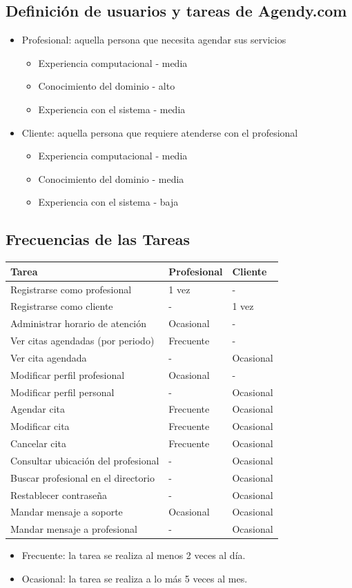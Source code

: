 \documentclass[letter, 10pt]{article}
\begin{document}
\subsection{Definición de usuarios y tareas de Agendy.com}
\begin{itemize}
	\item Profesional: aquella persona que necesita agendar sus servicios
	\begin{itemize}
		\item Experiencia computacional - media
		\item Conocimiento del dominio - alto
		\item Experiencia con el sistema - media
	\end{itemize}
	\item Cliente: aquella persona que requiere atenderse con el profesional
	\begin{itemize}
		\item Experiencia computacional - media
		\item Conocimiento del dominio - media
		\item Experiencia con el sistema - baja	
	\end{itemize}
\end{itemize}
\subsection{Frecuencias de las Tareas}
\begin{tabular}{|l|l|l|}
\hline
{\bf Tarea} & {\bf Profesional} & {\bf Cliente} \\\hline
Registrarse como profesional & 1 vez & - \\\hline
Registrarse como cliente & - & 1 vez \\\hline
Administrar horario de atención & Ocasional & - \\\hline
Ver citas agendadas (por periodo) & Frecuente & - \\\hline
Ver cita agendada & - & Ocasional \\\hline
Modificar perfil profesional & Ocasional & - \\\hline
Modificar perfil personal & - & Ocasional \\\hline
Agendar cita & Frecuente & Ocasional \\\hline
Modificar cita & Frecuente & Ocasional \\\hline
Cancelar cita & Frecuente & Ocasional \\\hline
Consultar ubicación del profesional & - & Ocasional \\\hline
Buscar profesional en el directorio & - & Ocasional \\\hline
Restablecer contraseña & - & Ocasional \\\hline
Mandar mensaje a soporte & Ocasional & Ocasional \\\hline
Mandar mensaje a profesional & - & Ocasional \\\hline
\end{tabular}
\begin{itemize}
	\item Frecuente: la tarea se realiza al menos 2 veces al día.
	\item Ocasional: la tarea se realiza a lo más 5 veces al mes.
\end{itemize}
\end{document}

